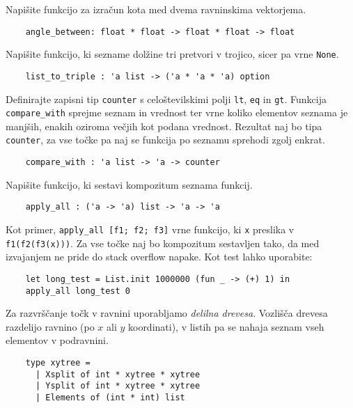 \documentclass[arhiv]{../izpit}
\begin{document}
	
	

	\naloga 
  
	\podnaloga Napišite funkcijo za izračun kota med dvema ravninskima vektorjema.
  \begin{verbatim}
    angle_between: float * float -> float * float -> float
  \end{verbatim}

  \podnaloga Napišite funkcijo, ki sezname dolžine tri pretvori v trojico, sicer pa vrne \verb|None|. 
  \begin{verbatim}
    list_to_triple : 'a list -> ('a * 'a * 'a) option
  \end{verbatim}

  \podnaloga Definirajte zapisni tip \verb|counter| s celoštevilskimi polji \verb|lt|, \verb|eq| in \verb|gt|. Funkcija \verb|compare_with| sprejme seznam in vrednost ter vrne koliko elementov seznama je manjših, enakih oziroma večjih kot podana vrednost. Rezultat naj bo tipa \verb|counter|, za vse točke pa naj se funkcija po seznamu sprehodi zgolj enkrat.
  \begin{verbatim}
    compare_with : 'a list -> 'a -> counter
	\end{verbatim}
	
  \podnaloga Napišite funkcijo, ki sestavi kompozitum seznama funkcij. 
  \begin{verbatim}
    apply_all : ('a -> 'a) list -> 'a -> 'a
	\end{verbatim}
  Kot primer, \verb|apply_all [f1; f2; f3]| vrne funkcijo, ki \verb|x| preslika v \verb|f1(f2(f3(x)))|. Za vse točke naj bo kompozitum sestavljen tako, da med izvajanjem ne pride do stack overflow napake. Kot test lahko uporabite:
  \begin{verbatim}
    let long_test = List.init 1000000 (fun _ -> (+) 1) in
    apply_all long_test 0
  \end{verbatim}

  \naloga
  
  Za razvrščanje točk v ravnini uporabljamo \emph{delilna drevesa}. Vozlišča drevesa razdelijo ravnino (po $x$ ali $y$ koordinati), v listih pa se nahaja seznam vseh elementov v podravnini.
  	\begin{verbatim}
    type xytree = 
      | Xsplit of int * xytree * xytree
      | Ysplit of int * xytree * xytree
      | Elements of (int * int) list
  	\end{verbatim}
  
\end{document}
